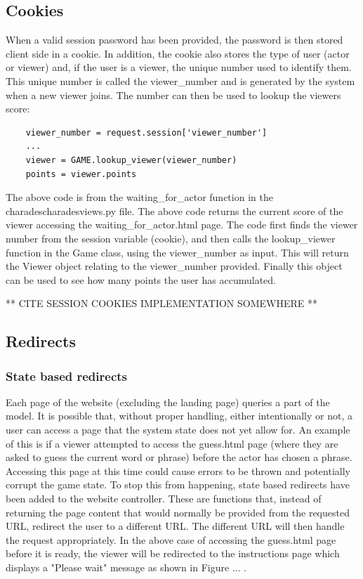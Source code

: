 \subsection{Cookies}
When a valid session password has been provided, the password is then stored client side in a cookie. In addition, the cookie also stores the type of user (actor or viewer) and, if the user is a viewer, the unique number used to identify them. This unique number is called the viewer\_number and is generated by the system when a new viewer joins. The number can then be used to lookup the viewers score:

\begin{verbatim}
	viewer_number = request.session['viewer_number']
	...
	viewer = GAME.lookup_viewer(viewer_number)
	points = viewer.points
\end{verbatim}

The above code is from the waiting\_for\_actor function in the \/charades\/charades\/views.py file. The above code returns the current score of the viewer accessing the waiting\_for\_actor.html page. The code first finds the viewer number from the session variable (cookie), and then calls the lookup\_viewer function in the Game class, using the viewer\_number as input. This will return the Viewer object relating to the viewer\_number provided. Finally this object can be used to see how many points the user has accumulated.

** CITE SESSION COOKIES IMPLEMENTATION SOMEWHERE ** 

\subsection{Redirects}
\subsubsection{State based redirects}
Each page of the website (excluding the landing page) queries a part of the model. It is possible that, without proper handling, either intentionally or not, a user can access a page that the system state does not yet allow for. An example of this is if a viewer attempted to access the guess.html page (where they are asked to guess the current word or phrase) before the actor has chosen a phrase. Accessing this page at this time could cause errors to be thrown and potentially corrupt the game state. To stop this from happening, state based redirects have been added to the website controller. These are functions that, instead of returning the page content that would normally be provided from the requested URL, redirect the user to a different URL. The different URL will then handle the request appropriately. In the above case of accessing the guess.html page before it is ready, the viewer will be redirected to the instructions page which displays a "Please wait" message as shown in Figure ... .

